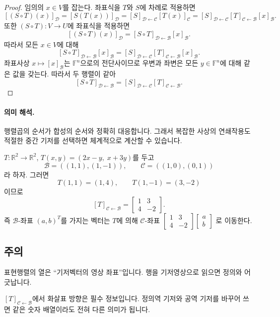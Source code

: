 \begin{proof}
임의의 $x\in V$를 잡는다. 좌표식을 $T$와 $S$에 차례로 적용하면
$$
[(S\circ T)(x)]_{\mathcal D}
=[S(T(x))]_{\mathcal D}
=[S]_{\mathcal D\leftarrow\mathcal C}[T(x)]_{\mathcal C}
=[S]_{\mathcal D\leftarrow\mathcal C}[T]_{\mathcal C\leftarrow\mathcal B}[x]_{\mathcal B}.
$$
또한 $(S\circ T):V\to U$에 좌표식을 적용하면
$$
[(S\circ T)(x)]_{\mathcal D}
=
[S\circ T]_{\mathcal D\leftarrow\mathcal B}[x]_{\mathcal B}.
$$
따라서 모든 $x\in V$에 대해
$$
[S\circ T]_{\mathcal D\leftarrow\mathcal B}[x]_{\mathcal B}
=
[S]_{\mathcal D\leftarrow\mathcal C}[T]_{\mathcal C\leftarrow\mathcal B}[x]_{\mathcal B}.
$$
좌표사상 $x\mapsto [x]_{\mathcal B}$는 $\mathbb F^n$으로의 전단사이므로 우변과 좌변은 모든 $y\in\mathbb F^n$에 대해 같은 값을 갖는다. 따라서 두 행렬이 같아
$$
[S\circ T]_{\mathcal D\leftarrow\mathcal B}
=
[S]_{\mathcal D\leftarrow\mathcal C}
[T]_{\mathcal C\leftarrow\mathcal B}.
$$
\end{proof}

\paragraph{의미 해석.}
행렬곱의 순서가 합성의 순서와 정확히 대응합니다. 그래서 복잡한 사상의 연쇄작용도 적절한 중간 기저를 선택하면 체계적으로 계산할 수 있습니다.

\begin{example}
$T:\mathbb R^2\to\mathbb R^2$, $T(x,y)=(2x-y,\;x+3y)$를 두고
$$
\mathcal B=((1,1),(1,-1)),\qquad \mathcal C=((1,0),(0,1))
$$
라 하자. 그러면
$$
T(1,1)=(1,4),\qquad T(1,-1)=(3,-2)
$$
이므로
$$
[T]_{\mathcal C\leftarrow\mathcal B}
=
\begin{bmatrix}
1&3\\
4&-2
\end{bmatrix}.
$$
즉 $\mathcal B$-좌표 $(a,b)^T$를 가지는 벡터는 $T$에 의해 $\mathcal C$-좌표
$\begin{bmatrix}1&3\\4&-2\end{bmatrix}\begin{bmatrix}a\\b\end{bmatrix}$
로 이동한다.
\end{example}

\subsection*{주의}
\begin{warning}
표현행렬의 열은 ``기저벡터의 영상 좌표''입니다. 행을 기저영상으로 읽으면 정의와 어긋납니다.
\end{warning}
\begin{warning}
$[T]_{\mathcal C\leftarrow\mathcal B}$에서 화살표 방향은 필수 정보입니다. 정의역 기저와 공역 기저를 바꾸어 쓰면 같은 숫자 배열이라도 전혀 다른 의미가 됩니다.
\end{warning}

